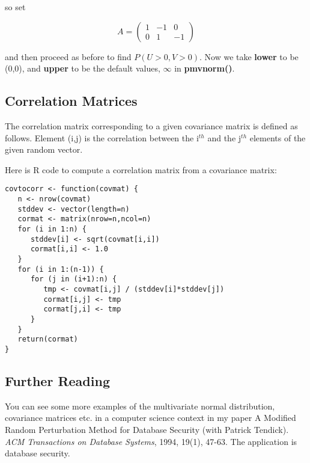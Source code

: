 so set

\begin{equation}
   A = 
      \left (
      \begin{array}{rrr}
      1 & -1 & 0\\
      0 & 1 & -1   
      \end{array}
      \right )     
\end{equation}

and then proceed as before to find $P(U > 0, V > 0)$.  Now we take
{\bf lower} to be (0,0), and {\bf upper} to be the default values,
$\infty$ in {\bf pmvnorm()}.

\subsection{Correlation Matrices}

The correlation matrix corresponding to a given covariance matrix is
defined as follows.  Element (i,j) is the correlation between the
i$^{th}$ and the j$^{th}$ elements of the given random vector.

Here is R code to compute a correlation matrix from a covariance matrix:

\begin{lstlisting}
covtocorr <- function(covmat) {
   n <- nrow(covmat)
   stddev <- vector(length=n)
   cormat <- matrix(nrow=n,ncol=n)
   for (i in 1:n) {
      stddev[i] <- sqrt(covmat[i,i])
      cormat[i,i] <- 1.0
   }
   for (i in 1:(n-1)) {
      for (j in (i+1):n) {
         tmp <- covmat[i,j] / (stddev[i]*stddev[j])
         cormat[i,j] <- tmp
         cormat[j,i] <- tmp
      }
   }
   return(cormat)
}
\end{lstlisting}

\subsection{Further Reading}

You can see some more examples of the multivariate normal distribution,
covariance matrices etc. in a computer science context in my paper 
A Modified Random Perturbation Method for Database Security (with
Patrick Tendick). {\it ACM Transactions on Database Systems}, 1994, 19(1),
47-63.  The application is database security.

